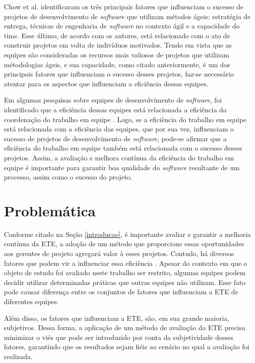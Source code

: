 Chow et al. \cite{chow} identificaram os três principais fatores que influenciam o sucesso de projetos de desenvolvimento de \textit{software} que utilizam métodos ágeis: estratégia de entrega, técnicas de engenharia de \textit{software} no contexto ágil e a capacidade do time. Esse último, de acordo com os autores, está relacionado com o ato de construir projetos em volta de indivíduos motivados. Tendo em vista que as equipes são consideradas os recursos mais valiosos de projetos que utilizam métodologias ágeis, e sua capacidade, como citado anteriormente, é um dos principais fatores que influenciam o sucesso desses projetos, faz-se necessário atentar para os aspectos que influenciam a eficiência dessas equipes.

Em algumas pesquisas sobre equipes de desenvolvimento de \textit{software}, foi identificado que a eficiência dessas equipes está relacionada a eficiência da coordenação do trabalho em equipe \cite{kraut} \cite{hoegl}. Logo, se a eficiência do trabalho em equipe está relacionada com a eficiência das equipes, que por sua vez, influenciam o sucesso de projetos de desenvolvimento de \textit{software}, pode-se afirmar que a eficiência do trabalho em equipe também está relacionada com o sucesso desses projetos. Assim, a avaliação e melhora contínua da eficiência do trabalho em equipe é importante para garantir boa qualidade do \textit{software} resultante de um processo, assim como o sucesso do projeto.

\section{Problemática}
\label{introducao:problematica}

Conforme citado na Seção \ref{introducao}, é importante avaliar e garantir a melhoria contínua da ETE, a adoção de um método que proporcione essas oportunidades aos gerentes de projeto agregará valor à esses projetos. Contudo, há diversos fatores que podem vir a influenciar essa eficiência \cite{}. Apesar do contexto em que o objeto de estudo foi avaliado neste trabalho ser restrito, algumas equipes podem decidir utilizar determinadas práticas que outras equipes não utilizam. Esse fato pode causar diferença entre os conjuntos de fatores que influenciam a ETE de diferentes equipes.

Além disso, os fatores que influenciam a ETE, são, em sua grande maioria, subjetivos. Dessa forma, a aplicação de um método de avaliação da ETE precisa minimizar o viés que pode ser introduzido por conta da subjetividade desses fatores, garantindo que os resultados sejam fiéis ao cenário no qual a avaliação foi realizada.

